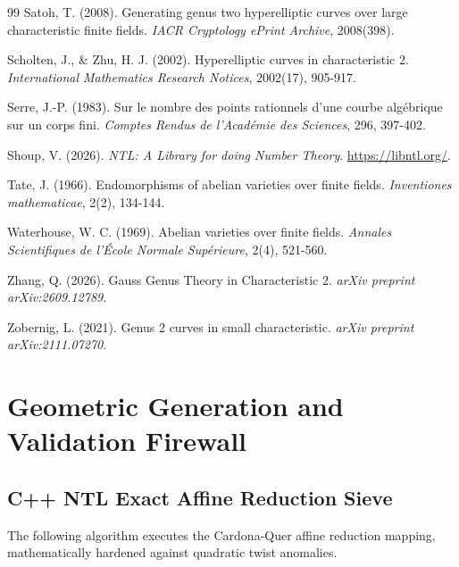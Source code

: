 \documentclass[11pt,letterpaper]{article}
\begin{document}
\begin{thebibliography}{99}
Satoh, T. (2008). Generating genus two hyperelliptic curves over large characteristic finite fields. \textit{IACR Cryptology ePrint Archive}, 2008(398).

Scholten, J., \& Zhu, H. J. (2002). Hyperelliptic curves in characteristic 2. \textit{International Mathematics Research Notices}, 2002(17), 905-917.

Serre, J.-P. (1983). Sur le nombre des points rationnels d'une courbe algébrique sur un corps fini. \textit{Comptes Rendus de l'Académie des Sciences}, 296, 397-402.

Shoup, V. (2026). \textit{NTL: A Library for doing Number Theory}. \url{https://libntl.org/}.

Tate, J. (1966). Endomorphisms of abelian varieties over finite fields. \textit{Inventiones mathematicae}, 2(2), 134-144.

Waterhouse, W. C. (1969). Abelian varieties over finite fields. \textit{Annales Scientifiques de l'\'{E}cole Normale Sup\'{e}rieure}, 2(4), 521-560.

Zhang, Q. (2026). Gauss Genus Theory in Characteristic 2. \textit{arXiv preprint arXiv:2609.12789}.

Zobernig, L. (2021). Genus 2 curves in small characteristic. \textit{arXiv preprint arXiv:2111.07270}.

\end{thebibliography}

\appendix
\section{Geometric Generation and Validation Firewall}
\subsection{C++ NTL Exact Affine Reduction Sieve}
The following algorithm executes the Cardona-Quer affine reduction mapping, mathematically hardened against quadratic twist anomalies.
\end{document}
